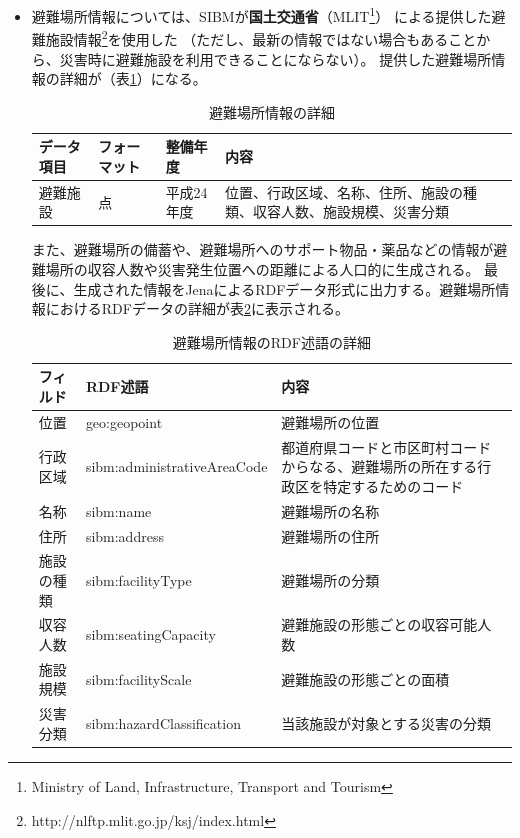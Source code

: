 \begin{itemize}
	\item
	避難場所情報については、SIBMが\textbf{国土交通省}（MLIT\footnote{Ministry of Land, Infrastructure,
	Transport and Tourism}）
	による提供した避難施設情報\footnote{http://nlftp.mlit.go.jp/ksj/index.html}を使用した
	（ただし、最新の情報ではない場合もあることから、災害時に避難施設を利用できることにならない）。
	提供した避難場所情報の詳細が（表\ref{table:data_shelter}）になる。
	
	\begin{table}[h]
	\begin{center}
	\begin{tabular}{| l | l | l | p{48mm} |}
		\hline
		\rowstyle{\bfseries}
		データ項目 & フォーマット & 整備年度 & 内容 \\
		\hline
		避難施設 & 点 & 平成24年度 & 位置、行政区域、名称、住所、施設の種類、収容人数、施設規模、災害分類 \\
		\hline
	\end{tabular}
	\caption{避難場所情報の詳細}
	\label{table:data_shelter}
	\end{center}
	\end{table}
	
	また、避難場所の備蓄や、避難場所へのサポート物品・薬品などの情報が避難場所の収容人数や災害発生位置への距離による人口的に生成される。
	最後に、生成された情報をJenaによるRDFデータ形式に出力する。避難場所情報におけるRDFデータの詳細が表\ref{table:data_rdf_predicate}に表示される。
	
	\begin{table}[h]
	\begin{center}
	\begin{tabular}{| l | l | p{48mm} |}
		\hline
		\rowstyle{\bfseries}
		フィルド & RDF述語 & 内容 \\
		\hline
		位置 & geo:geopoint & 避難場所の位置 \\
		\hline
		行政区域 & sibm:administrativeAreaCode &
		都道府県コードと市区町村コードからなる、避難場所の所在する行政区を特定するためのコード \\
		\hline
		名称 & sibm:name & 避難場所の名称 \\
		\hline
		住所 & sibm:address & 避難場所の住所 \\
		\hline
		施設の種類 & sibm:facilityType & 避難場所の分類 \\
		\hline
		収容人数 & sibm:seatingCapacity & 避難施設の形態ごとの収容可能人数 \\
		\hline
		施設規模 & sibm:facilityScale & 避難施設の形態ごとの面積 \\
		\hline
		災害分類 & sibm:hazardClassification & 当該施設が対象とする災害の分類 \\
		\hline
	\end{tabular}
	\caption{避難場所情報のRDF述語の詳細}
	\label{table:data_rdf_predicate}
	\end{center}
	\end{table}


\end{itemize}

